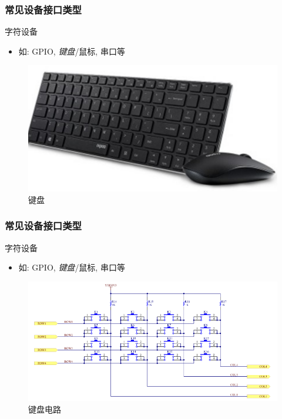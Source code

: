 \begin{frame}[fragile]
    \frametitle{常见设备接口类型}
    字符设备
    \begin{itemize}
        \item 如: GPIO, \emph{键盘}/鼠标, 串口等
    \end{itemize}
    \begin{figure}
        \includegraphics[width=0.47\linewidth]{figs/char-dev.png}
        \caption{键盘}
    \end{figure}
\end{frame}
\begin{frame}[fragile]
    \frametitle{常见设备接口类型}
    字符设备
    \begin{itemize}
        \item 如: GPIO, \emph{键盘}/鼠标, 串口等
    \end{itemize}
    \begin{figure}
        \includegraphics[width=0.6\linewidth]{figs/char-keyboard.png}
        \caption{键盘电路}
    \end{figure}
\end{frame}

